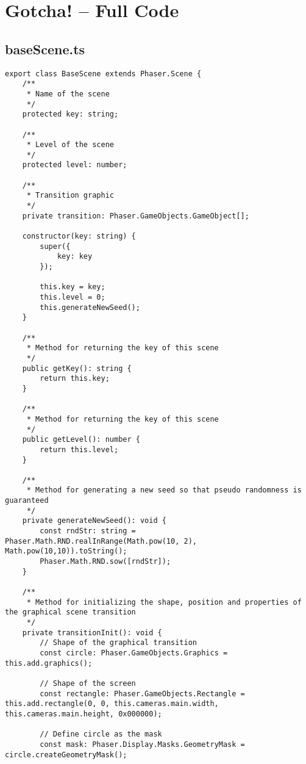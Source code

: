 

\chapter{Gotcha! -- Full Code}\label{ch:gotcha!---full-code}
\section{baseScene.ts}\label{sec:basescene.ts}
\begin{lstlisting}[style=TypeScript, caption={baseScene.ts}]
export class BaseScene extends Phaser.Scene {
    /**
     * Name of the scene
     */
    protected key: string;

    /**
     * Level of the scene
     */
    protected level: number;

    /**
     * Transition graphic
     */
    private transition: Phaser.GameObjects.GameObject[];

    constructor(key: string) {
        super({
            key: key
        });

        this.key = key;
        this.level = 0;
        this.generateNewSeed();
    }

    /**
     * Method for returning the key of this scene
     */
    public getKey(): string {
        return this.key;
    }

    /**
     * Method for returning the key of this scene
     */
    public getLevel(): number {
        return this.level;
    }

    /**
     * Method for generating a new seed so that pseudo randomness is guaranteed
     */
    private generateNewSeed(): void {
        const rndStr: string = Phaser.Math.RND.realInRange(Math.pow(10, 2), Math.pow(10,10)).toString();
        Phaser.Math.RND.sow([rndStr]);
    }

    /**
     * Method for initializing the shape, position and properties of the graphical scene transition
     */
    private transitionInit(): void {
        // Shape of the graphical transition
        const circle: Phaser.GameObjects.Graphics = this.add.graphics();

        // Shape of the screen
        const rectangle: Phaser.GameObjects.Rectangle = this.add.rectangle(0, 0, this.cameras.main.width, this.cameras.main.height, 0x000000);

        // Define circle as the mask
        const mask: Phaser.Display.Masks.GeometryMask = circle.createGeometryMask();


\end{lstlisting}
